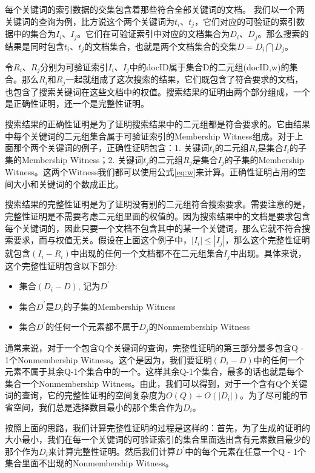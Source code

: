 每个关键词的索引数据的交集包含着那些符合全部关键词的文档。
我们以一个两关键词的查询为例，比方说这个两个关键词为$t_i$、$t_j$，它们对应的可验证的索引数据中的集合为$I_i$、$I_j$。它们在可验证索引中对应的文档集合为$D_i$、$D_j$。那么搜索的结果是同时包含$t_i$、$t_j$的文档集合，也就是两个文档集合的交集$D = D_i \bigcap D_j$。

令$R_i$、$R_j$分别为可验证索引$I_i$、$I_j$中的docID属于集合D的二元组(docID,w)的集合。那么$R_i$和$R_j$一起就组成了这次搜索的结果，它们既包含了符合要求的文档，也包含了搜索关键词在这些文档中的权值。搜索结果的证明由两个部分组成，一个是正确性证明，还一个是完整性证明。

搜索结果的正确性证明是为了证明搜索结果中的二元组都是符合要求的。它由结果中每个关键词的二元组集合属于可验证索引的Membership Witness组成。对于上面那个两个关键词的例子，正确性证明包含：1. 关键词$t_i$的二元组$R_i$是集合$I_i$的子集的Membership Witness；2. 关键词$t_j$的二元组$R_j$是集合$I_j$的子集的Membership Witness。这两个Witness我们都可以使用公式\ref{eq:w}来计算。正确性证明占用的空间大小和关键词的个数成正比。

搜索结果的完整性证明是为了证明没有别的二元组符合搜索要求。需要注意的是，完整性证明是不需要考虑二元组里面的权值的。因为搜索结果中的文档是要求包含每个关键词的，因此只要一个文档不包含其中的某一个关键词，那么它就不符合搜索要求，而与权值无关。假设在上面这个例子中，$|I_i| \le |I_j|$，那么这个完整性证明就包含$(I_i - R_i)$中出现的任何一个文档都不在二元组集合$I_j$中出现。具体来说，这个完整性证明包含以下部分:
\begin{itemize}
\item 集合$(D_i - D)$, 记为$D^\prime$
\item 集合$D^\prime$是$D_i$的子集的Membership Witness
\item 集合$D^\prime$的任何一个元素都不属于$D_j$的Nonmembership Witness
\end{itemize}

通常来说，对于一个包含Q个关键词的查询，完整性证明的第三部分最多包含Q - 1个Nonmembership Witness。这个是因为，我们要证明$(D_i - D)$中的任何一个元素不属于其余Q-1个集合中的一个。这样其余Q-1个集合，最多的话也就是每个集合一个Nonmembership Witness。由此，我们可以得到，对于一个含有Q个关键词的查询，它的完整性证明的空间复杂度为$O(Q) + O(|D_i|)$。为了尽可能的节省空间，我们总是选择数目最小的那个集合作为$D_i$。

按照上面的思路，我们计算完整性证明的过程是这样的：首先，为了生成的证明的大小最小，我们在每一个关键词的可验证索引的集合里面选出含有元素数目最少的那个作为$D_i$来计算完整性证明。然后我们计算$D^\prime$中的每个元素在任意一个Q - 1个集合里面不出现的Nonmembership Witness。

